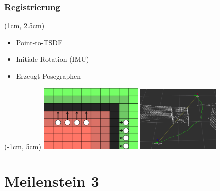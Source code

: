 \documentclass{beamer}
\begin{document}
\subsubsection*{Registrierung}
\begin{frame}{\subsubsecname}
\begin{center}
\begin{textblock*}{10cm} (1cm, 2.5cm)
\begin{itemize}
\item Point-to-TSDF
\item Initiale Rotation (IMU)
\item Erzeugt Posegraphen 
\end{itemize}    
\end{textblock*}
\begin{textblock*}{15cm}(-1cm, 5cm)
\includegraphics[width=5cm]{images/Reg_Gradient.pdf}
\includegraphics[width=4cm]{images/Pose_Graph_rviz.png} 
\end{textblock*}
\end{center}
\end{frame}

\section{Meilenstein 3}
\begin{frame}
\centering
\color{dark}\LARGE\textbf{\secname}
\end{frame}
\end{document}
